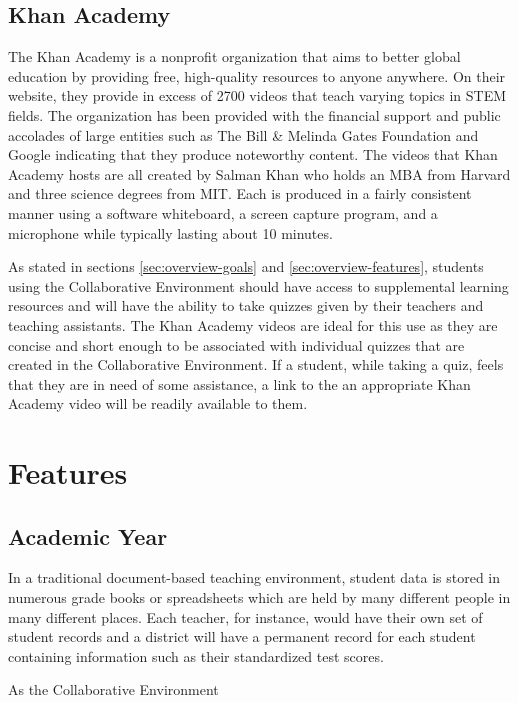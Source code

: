 \subsection{Khan Academy}
The Khan Academy is a nonprofit organization that aims to better global education by providing free, high-quality resources to anyone anywhere. \cite{khan-website-about} On their website, they provide in excess of 2700 videos that teach varying topics in STEM fields. The organization has been provided with the financial support and public accolades of large entities such as The Bill \& Melinda Gates Foundation and Google \cite{khan-wiki-sources} indicating that they produce noteworthy content. The videos that Khan Academy hosts are all created by Salman Khan who holds an MBA from Harvard and three science degrees from MIT. Each is produced in a fairly consistent manner using a software whiteboard, a screen capture program, and a microphone while typically lasting about 10 minutes.

As stated in sections \ref{sec:overview-goals} and \ref{sec:overview-features}, students using the Collaborative Environment should have access to supplemental learning resources and will have the ability to take quizzes given by their teachers and teaching assistants. The Khan Academy videos are ideal for this use as they are concise and short enough to be associated with individual quizzes that are created in the Collaborative Environment. If a student, while taking a quiz, feels that they are in need of some assistance, a link to the an appropriate Khan Academy video will be readily available to them.

\section{Features}
\label{sec:features}

\subsection{Academic Year}
In a traditional document-based teaching environment, student data is stored in numerous grade books  or spreadsheets which are held by many different people in many different places. Each teacher, for instance, would have their own set of student records and a district will have a permanent record for each student containing information such as their standardized test scores.

As the Collaborative Environment 


